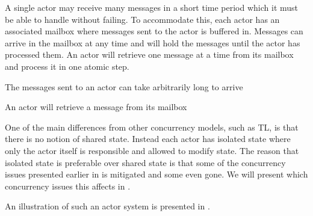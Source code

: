 A single actor may receive many messages in a short time period which it must be able to handle without failing. To accommodate this, each actor has an associated mailbox where messages sent to the actor is buffered in\cite[Chap. 2.6]{haller2012actors}. Messages can arrive in the mailbox at any time and will hold the messages until the actor has processed them. An actor will retrieve one message at a time from its mailbox and process it in one atomic step\cite[p. 2]{karmani2009actor}. %

The messages sent to an actor can take arbitrarily long to arrive


An actor will retrieve a message from its mailbox 





One of the main differences from other concurrency models, such as \ac{TL}, is that there is no notion of shared state. Instead each actor has isolated state where only the actor itself is responsible and allowed to modify state. The reason that isolated state is preferable over shared state is that some of the concurrency issues presented earlier in  is mitigated and some even gone. We will present which concurrency issues this affects in .


An illustration of such an actor system is presented in .







